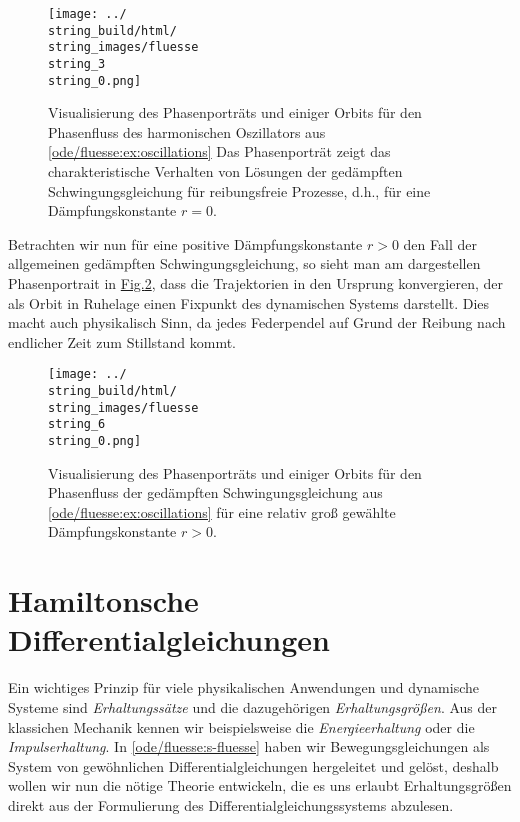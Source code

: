 \begin{figure}[htbp]
\centering


\noindent\texttt{[image: ../\\string\_build/html/\\string\_images/fluesse\\string\_3\\string\_0.png]}
\caption{Visualisierung des Phasenporträts und einiger Orbits für den Phasenfluss des harmonischen Oszillators aus \cref{ode/fluesse:ex:oscillations}  Das Phasenporträt zeigt das charakteristische Verhalten von Lösungen der gedämpften Schwingungsgleichung für reibungsfreie Prozesse, d.h., für eine Dämpfungskonstante \(r = 0\).}\label{\detokenize{ode/fluesse:fig-harmonic-oscillator}}\end{figure}

\par
Betrachten wir nun für eine positive Dämpfungskonstante \(r > 0\) den Fall der allgemeinen gedämpften Schwingungsgleichung, so sieht man am dargestellen Phasenportrait in \hyperref[\detokenize{ode/fluesse:fig-damped-oscillator}]{Fig.\@ \ref{\detokenize{ode/fluesse:fig-damped-oscillator}}}, dass die Trajektorien in den Ursprung konvergieren, der als Orbit in Ruhelage einen Fixpunkt des dynamischen Systems darstellt.
Dies macht auch physikalisch Sinn, da jedes Federpendel auf Grund der Reibung nach endlicher Zeit zum Stillstand kommt.

\begin{figure}[htbp]
\centering


\noindent\texttt{[image: ../\\string\_build/html/\\string\_images/fluesse\\string\_6\\string\_0.png]}
\caption{Visualisierung des Phasenporträts und einiger Orbits für den Phasenfluss der gedämpften Schwingungsgleichung aus \cref{ode/fluesse:ex:oscillations} für eine relativ groß gewählte Dämpfungskonstante \(r > 0\).}\label{\detokenize{ode/fluesse:fig-damped-oscillator}}\end{figure}


\section{Hamiltonsche Differentialgleichungen}
\label{\detokenize{ode/hamilton:hamiltonsche-differentialgleichungen}}\label{\detokenize{ode/hamilton::doc}}
\par
Ein wichtiges Prinzip für viele physikalischen Anwendungen und dynamische Systeme sind \emph{Erhaltungssätze} und die dazugehörigen \emph{Erhaltungsgrößen}.
Aus der klassichen Mechanik kennen wir beispielsweise die \emph{Energieerhaltung} oder die \emph{Impulserhaltung}.
In \cref{ode/fluesse:s-fluesse}  haben wir Bewegungsgleichungen als System von gewöhnlichen Differentialgleichungen hergeleitet und gelöst, deshalb wollen wir nun die nötige Theorie entwickeln, die es uns erlaubt Erhaltungsgrößen direkt aus der Formulierung des Differentialgleichungssystems abzulesen.

